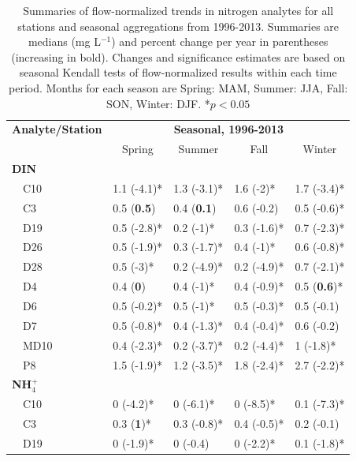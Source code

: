 \documentclass[letterpaper,12pt,oneside]{article}\usepackage[]{graphicx}\usepackage[]{color}
\begin{document}
\begin{table}[!tbp]
\caption{Summaries of flow-normalized trends in nitrogen analytes for all stations and seasonal aggregations from 1996-2013. Summaries are  medians (mg L$^{-1}$) and percent change per year in parentheses (increasing in bold). Changes and significance estimates are based on seasonal Kendall tests of flow-normalized results within each time period. Months for each season are Spring: MAM, Summer: JJA, Fall: SON, Winter: DJF. *$p<0.05$\label{tab:trndsaft}} 
\begin{center}
\begin{tabular}{lllll}
\hline\hline
\multicolumn{1}{l}{\bfseries Analyte/Station}&\multicolumn{4}{c}{\bfseries Seasonal, 1996-2013}\tabularnewline
\cline{2-5}
\multicolumn{1}{l}{}&\multicolumn{1}{c}{Spring}&\multicolumn{1}{c}{Summer}&\multicolumn{1}{c}{Fall}&\multicolumn{1}{c}{Winter}\tabularnewline
\hline
{\bfseries DIN}&&&&\tabularnewline
~~C10&1.1 \footnotesize{(-4.1)*}&1.3 \footnotesize{(-3.1)*}&1.6 \footnotesize{(-2)*}&1.7 \footnotesize{(-3.4)*}\tabularnewline
~~C3&0.5 \footnotesize{(\textbf{0.5})}&0.4 \footnotesize{(\textbf{0.1})}&0.6 \footnotesize{(-0.2)}&0.5 \footnotesize{(-0.6)*}\tabularnewline
~~D19&0.5 \footnotesize{(-2.8)*}&0.2 \footnotesize{(-1)*}&0.3 \footnotesize{(-1.6)*}&0.7 \footnotesize{(-2.3)*}\tabularnewline
~~D26&0.5 \footnotesize{(-1.9)*}&0.3 \footnotesize{(-1.7)*}&0.4 \footnotesize{(-1)*}&0.6 \footnotesize{(-0.8)*}\tabularnewline
~~D28&0.5 \footnotesize{(-3)*}&0.2 \footnotesize{(-4.9)*}&0.2 \footnotesize{(-4.9)*}&0.7 \footnotesize{(-2.1)*}\tabularnewline
~~D4&0.4 \footnotesize{(\textbf{0})}&0.4 \footnotesize{(-1)*}&0.4 \footnotesize{(-0.9)*}&0.5 \footnotesize{(\textbf{0.6})*}\tabularnewline
~~D6&0.5 \footnotesize{(-0.2)*}&0.5 \footnotesize{(-1)*}&0.5 \footnotesize{(-0.3)*}&0.5 \footnotesize{(-0.1)}\tabularnewline
~~D7&0.5 \footnotesize{(-0.8)*}&0.4 \footnotesize{(-1.3)*}&0.4 \footnotesize{(-0.4)*}&0.6 \footnotesize{(-0.2)}\tabularnewline
~~MD10&0.4 \footnotesize{(-2.3)*}&0.2 \footnotesize{(-3.7)*}&0.2 \footnotesize{(-4.4)*}&1 \footnotesize{(-1.8)*}\tabularnewline
~~P8&1.5 \footnotesize{(-1.9)*}&1.2 \footnotesize{(-3.5)*}&1.8 \footnotesize{(-2.4)*}&2.7 \footnotesize{(-2.2)*}\tabularnewline
\hline
{\bfseries NH$_{4}^{+}$}&&&&\tabularnewline
~~C10&0 \footnotesize{(-4.2)*}&0 \footnotesize{(-6.1)*}&0 \footnotesize{(-8.5)*}&0.1 \footnotesize{(-7.3)*}\tabularnewline
~~C3&0.3 \footnotesize{(\textbf{1})*}&0.3 \footnotesize{(-0.8)*}&0.4 \footnotesize{(-0.5)*}&0.2 \footnotesize{(-0.1)}\tabularnewline
~~D19&0 \footnotesize{(-1.9)*}&0 \footnotesize{(-0.4)}&0 \footnotesize{(-2.2)*}&0.1 \footnotesize{(-1.8)*}\tabularnewline

\end{tabular}
\end{center}
\end{table}
\end{document}

